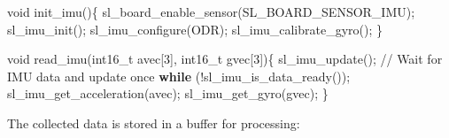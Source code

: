 \documentclass[
  9pt,
  letterpaper,
  abstract,
  titlepage]{scrbook}
\newenvironment{Shaded}{\begin{snugshade}}{\end{snugshade}}
\newcommand{\CommentTok}[1]{\textcolor[rgb]{0.37,0.37,0.37}{#1}}
\newcommand{\ControlFlowTok}[1]{\textcolor[rgb]{0.00,0.23,0.31}{\textbf{#1}}}
\newcommand{\DataTypeTok}[1]{\textcolor[rgb]{0.68,0.00,0.00}{#1}}
\newcommand{\DecValTok}[1]{\textcolor[rgb]{0.68,0.00,0.00}{#1}}
\newcommand{\NormalTok}[1]{\textcolor[rgb]{0.00,0.23,0.31}{#1}}
\newcommand{\OperatorTok}[1]{\textcolor[rgb]{0.37,0.37,0.37}{#1}}
\begin{document}
\begin{Shaded}
\begin{Highlighting}[]
\DataTypeTok{void}\NormalTok{ init\_imu}\OperatorTok{()\{}
\NormalTok{  sl\_board\_enable\_sensor}\OperatorTok{(}\NormalTok{SL\_BOARD\_SENSOR\_IMU}\OperatorTok{);}
\NormalTok{  sl\_imu\_init}\OperatorTok{();}
\NormalTok{  sl\_imu\_configure}\OperatorTok{(}\NormalTok{ODR}\OperatorTok{);}
\NormalTok{  sl\_imu\_calibrate\_gyro}\OperatorTok{();}
\OperatorTok{\}}

\DataTypeTok{void}\NormalTok{ read\_imu}\OperatorTok{(}\DataTypeTok{int16\_t}\NormalTok{ avec}\OperatorTok{[}\DecValTok{3}\OperatorTok{],} \DataTypeTok{int16\_t}\NormalTok{ gvec}\OperatorTok{[}\DecValTok{3}\OperatorTok{])\{}
\NormalTok{  sl\_imu\_update}\OperatorTok{();}
  \CommentTok{// Wait for IMU data and update once}
  \ControlFlowTok{while} \OperatorTok{(!}\NormalTok{sl\_imu\_is\_data\_ready}\OperatorTok{());}
\NormalTok{  sl\_imu\_get\_acceleration}\OperatorTok{(}\NormalTok{avec}\OperatorTok{);}
\NormalTok{  sl\_imu\_get\_gyro}\OperatorTok{(}\NormalTok{gvec}\OperatorTok{);}
\OperatorTok{\}}
\end{Highlighting}
\end{Shaded}

The collected data is stored in a buffer for processing:
\end{document}
